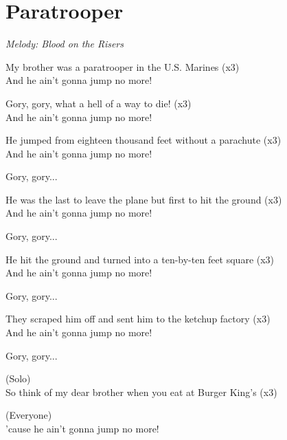\section{Paratrooper}

\textit{Melody: Blood on the Risers}

My brother was a paratrooper in the U.S. Marines (x3)\\
And he ain't gonna jump no more!

Gory, gory, what a hell of a way to die! (x3)\\
And he ain't gonna jump no more!

He jumped from eighteen thousand feet without a parachute (x3)\\
And he ain't gonna jump no more!

Gory, gory...

He was the last to leave the plane but first to hit the ground (x3)\\
And he ain't gonna jump no more!

Gory, gory...

He hit the ground and turned into a ten-by-ten feet square (x3)\\
And he ain't gonna jump no more!

Gory, gory...

They scraped him off and sent him to the ketchup factory (x3)\\
And he ain't gonna jump no more!

Gory, gory...

(Solo)\\
So think of my dear brother when you eat at Burger King's (x3)

(Everyone)\\
'cause he ain't gonna jump no more!